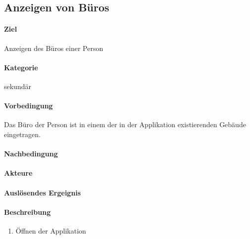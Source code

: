 \subsection{Anzeigen von Büros}
\label{Anzeigen von Büros}
\paragraph{Ziel}
Anzeigen des Büros einer Person
\paragraph{Kategorie}
sekundär
\paragraph{Vorbedingung}
Das Büro der Person ist in einem der in der Applikation existierenden Gebäude eingetragen.
\paragraph{Nachbedingung}

\paragraph{Akteure}

\paragraph{Auslösendes Ergeignis}

\paragraph{Beschreibung}
\begin{enumerate}
    \item Öffnen der Applikation
\end{enumerate}